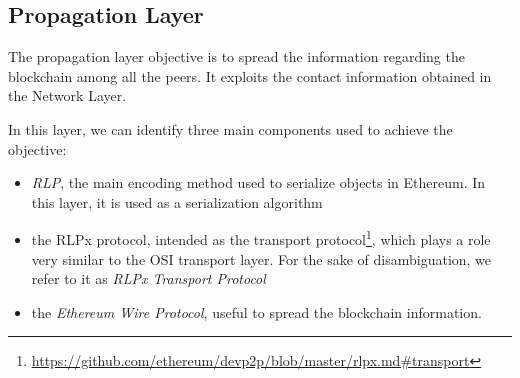 \subsection{Propagation Layer}
\label{sec:propagation-layer}

The propagation layer objective is to spread the information regarding the
blockchain among all the peers. It exploits the contact information obtained
in the Network Layer.

In this layer, we can identify three main components used to achieve the
objective:
\begin{itemize}
  \item \emph{RLP}, the main encoding method used to serialize objects in Ethereum. In
  this layer, it is used as a serialization algorithm
  \item the RLPx protocol, intended as the transport
  protocol\footnote{\url{https://github.com/ethereum/devp2p/blob/master/rlpx.md\#transport}},
  which plays a role very similar to the OSI transport layer. For the sake of
  disambiguation, we refer to it as \emph{RLPx Transport Protocol}
  \item the \emph{Ethereum Wire Protocol}, useful to spread the blockchain
  information.
\end{itemize}
